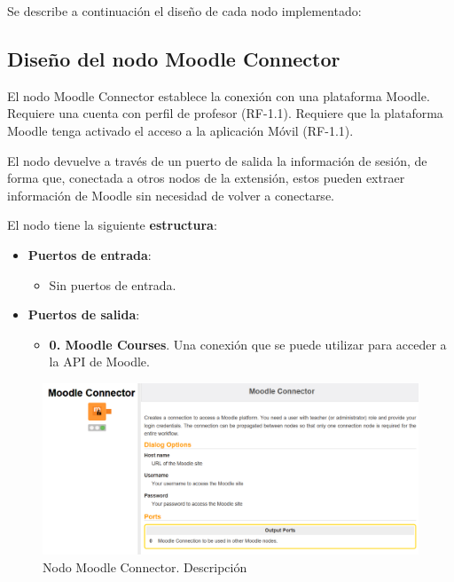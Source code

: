 Se describe a continuación el diseño de cada nodo implementado: 

\newpage
\subsection{Diseño del nodo Moodle Connector}

El nodo Moodle Connector establece la conexión con una plataforma Moodle. Requiere una cuenta con perfil de profesor (RF-1.1). 
Requiere que la plataforma Moodle tenga activado el acceso a la aplicación Móvil (RF-1.1). 
\

El nodo devuelve a través de un puerto de salida la información de sesión, de forma que, conectada a otros nodos de la extensión, 
estos pueden extraer información de Moodle sin necesidad de volver a conectarse.
\ 

El nodo tiene la siguiente \textbf{estructura}:

\begin{itemize}
	\item \textbf{Puertos de entrada}: 
    \begin{itemize}
		\item Sin puertos de entrada. 
   	\end{itemize}

	\item \textbf{Puertos de salida}: 
    \begin{itemize}
		\item \textbf{0. Moodle Courses}. Una conexión que se puede utilizar para acceder a la API de Moodle. 
   	\end{itemize}

\end{itemize}

\begin{figure}[!h]
	\centering
	\includegraphics[width=1\textwidth]{img/nodes_moodle_connector.png}
	\caption{Nodo Moodle Connector. Descripción}
	\label{fig:moodleconnector}
\end{figure}
\FloatBarrier


